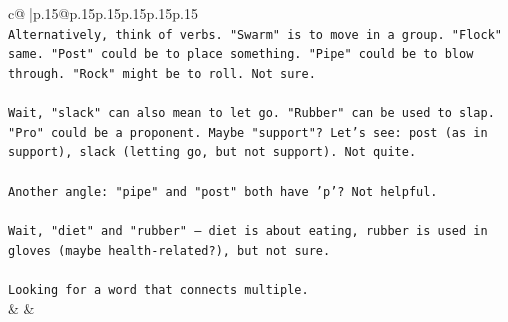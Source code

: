 \documentclass{article}
\begin{document}
{\begin{supertabular}{c@{$\;$}|p{.15\linewidth}@{}p{.15\linewidth}p{.15\linewidth}p{.15\linewidth}p{.15\linewidth}p{.15\linewidth}}
{{{\\ 
\texttt{Alternatively, think of verbs. "Swarm" is to move in a group. "Flock" same. "Post" could be to place something. "Pipe" could be to blow through. "Rock" might be to roll. Not sure. } \\
\\ 
\texttt{Wait, "slack" can also mean to let go. "Rubber" can be used to slap. "Pro" could be a proponent. Maybe "support"? Let's see: post (as in support), slack (letting go, but not support). Not quite. } \\
\\ 
\texttt{Another angle: "pipe" and "post" both have 'p'? Not helpful. } \\
\\ 
\texttt{Wait, "diet" and "rubber" – diet is about eating, rubber is used in gloves (maybe health{-}related?), but not sure. } \\
\\ 
\texttt{Looking for a word that connects multiple.} \\
            }
        }
    }
    & & \\ \\


\end{supertabular}}
\end{document}
